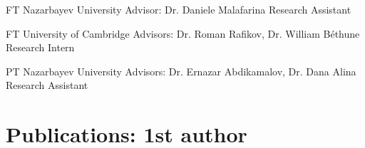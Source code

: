 \documentclass[10pt]{article} %
\begin{document}
\begin{paracol}{1}



{FT} %
{Nazarbayev University} %
{Advisor: Dr. Daniele Malafarina} %
{Research Assistant}  %


{FT} %
{University of Cambridge} %
{Advisors: Dr. Roman Rafikov, Dr. William B\'ethune} %
{Research Intern} %


{PT} %
{Nazarbayev University} %
{Advisors: Dr. Ernazar Abdikamalov, Dr. Dana Alina} %
{Research Assistant} %


\vspace*{1mm} %


\section{Publications: 1st author}


\end{paracol}
\end{document}
